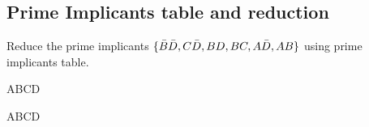 \subsection{Prime Implicants table and reduction}

\begin{example}
  Reduce the prime implicants $\{ \bar{B} \bar{D}, C\bar{D}, BD, BC, A\bar{D}, AB \}$ using prime
  implicants table.
\end{example}
\vspace{20em}

\begin{example}
  \begin{Karnaugh}{AB}{CD}
  \end{Karnaugh}
\end{example}
\vspace{10em}

\begin{example}
  \begin{Karnaugh}{AB}{CD}
  \end{Karnaugh}
\end{example}
\vspace{10em}

